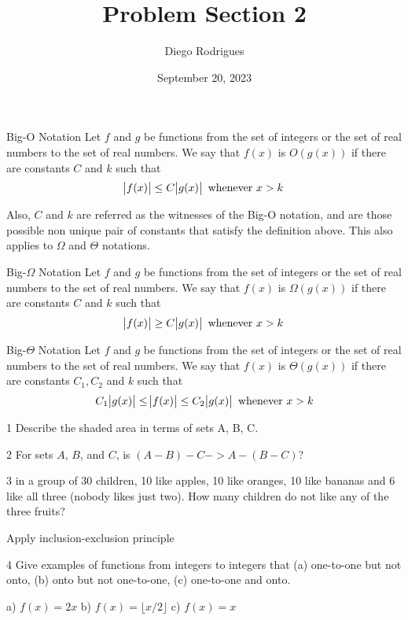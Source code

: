 \documentclass{extarticle}
\title{Problem Section 2}
\author{Diego Rodrigues}
\date{September 20, 2023}
\newenvironment{problem}[1]{\begin{prob*}{#1}{}}{\end{prob*}}
\newenvironment{definition}[1]{\begin{defn*}{#1}{}}{\end{defn*}}
\begin{document}
\maketitle

\begin{definition}{Big-O Notation}
	Let $f$ and $g$ be functions from the set of integers or the set of real numbers to the set of real numbers. 
	We say that $f(x)$ is $O(g(x))$ if there are constants $C$ and $k$ such that
	$$\abs{f(x)} \le C\abs{g(x)} \text{ whenever } x > k$$
\end{definition}
Also, $C$ and $k$ are referred as the witnesses of the Big-O notation, and are those possible non unique pair of constants that satisfy the definition above.
This also applies to $\Omega$ and $\Theta$ notations.

\begin{definition}{Big-$\Omega$ Notation}
	Let $f$ and $g$ be functions from the set of integers or the set of real numbers to the set of real numbers. 
	We say that $f(x)$ is $\Omega(g(x))$ if there are constants $C$ and $k$ such that
	$$\abs{f(x)} \ge C\abs{g(x)} \text{ whenever } x > k$$
\end{definition}

\begin{definition}{Big-$\Theta$ Notation}
	Let $f$ and $g$ be functions from the set of integers or the set of real numbers to the set of real numbers.
	We say that $f(x)$ is $\Theta(g(x))$ if there are constants $C_1, C_2$ and $k$ such that
	$$C_1\abs{g(x)} \le \abs{f(x)} \le C_2\abs{g(x)} \text{ whenever } x > k$$
\end{definition}

\begin{problem}{1}
    Describe the shaded area in terms of sets A, B, C.
\end{problem}

\begin{problem}{2}
    For sets $A$, $B$, and $C$, is $(A - B) - C -> A - (B - C)$?
\end{problem}

\begin{problem}{3}
    in a group of 30 children, 10 like apples, 10 like oranges, 10 like bananas
    and 6 like all three (nobody likes just two). How many children do not like any of
    the three fruits? 
\end{problem}
Apply inclusion-exclusion principle 

\begin{problem}{4}
    Give examples of functions from integers to integers that (a) one-to-one but not onto,
    (b) onto but not one-to-one, (c) one-to-one and onto.
\end{problem}
a) $f(x) = 2x$ 
b) $f(x) = \lfloor{x/2}\rfloor$
c) $f(x) = x$
\end{document}
